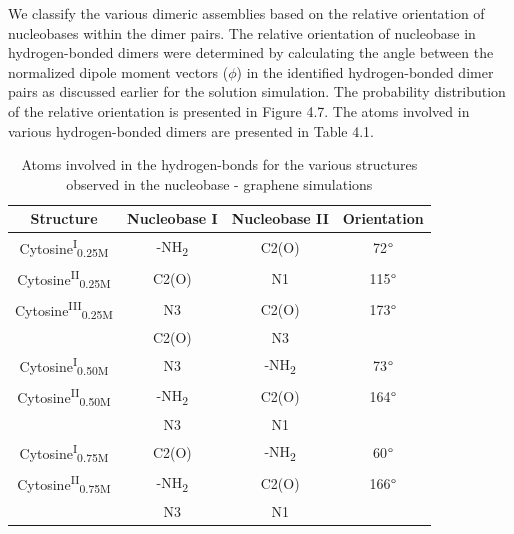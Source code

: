 We classify the various dimeric assemblies based on the relative orientation of nucleobases within the dimer pairs. The relative orientation of nucleobase in hydrogen-bonded dimers were determined by calculating the angle between the normalized dipole moment vectors ($\phi$) in the identified hydrogen-bonded dimer pairs as discussed earlier for the solution simulation. The probability distribution of the relative orientation is presented in Figure 4.7. The atoms involved in various hydrogen-bonded dimers are presented in Table 4.1.
\begin{table}
    \centering
    \caption[Atoms involved in the hydrogen-bonds for the various structures observed in the nucleobase - graphene simulations]{Atoms involved in the hydrogen-bonds for the various structures observed in the nucleobase - graphene simulations}
    \begin{tabular}{cccc}
        \toprule
        Structure   &   Nucleobase I    &   Nucleobase II     &     Orientation \\ \midrule
        Cytosine\textsuperscript{I}\textsubscript{0.25M}    &   -NH\textsubscript{2}    &   C2(O)   &   72$\degree$ \\
        Cytosine\textsuperscript{II}\textsubscript{0.25M}   &   C2(O)   &   N1      &   115$\degree$    \\
        Cytosine\textsuperscript{III}\textsubscript{0.25M}  &   N3      &   C2(O)   &   173$\degree$    \\
                                                            &   C2(O)   &   N3      &   \\
        Cytosine\textsuperscript{I}\textsubscript{0.50M}    &   N3      &   -NH\textsubscript{2}    &   73$\degree$ \\
        Cytosine\textsuperscript{II}\textsubscript{0.50M}   &   -NH\textsubscript{2}    &   C2(O)   &   164$\degree$    \\
                                                            &   N3      &   N1      &   \\
        Cytosine\textsuperscript{I}\textsubscript{0.75M}    &   C2(O)   &   -NH\textsubscript{2}    &   60$\degree$ \\
        Cytosine\textsuperscript{II}\textsubscript{0.75M}   &   -NH\textsubscript{2}    &   C2(O)   &   166$\degree$    \\
                                                            &   N3      &   N1      &   \\  \bottomrule
    \end{tabular}
\end{table}

